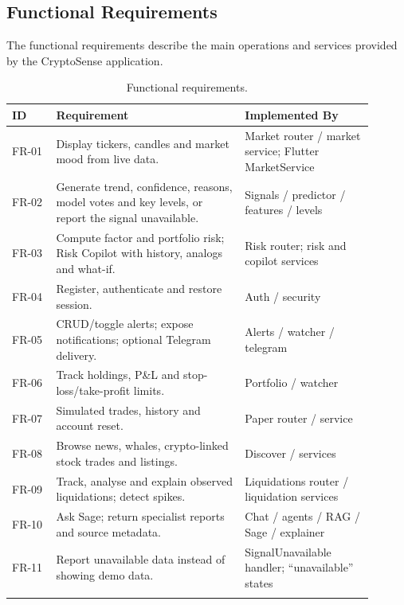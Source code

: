 \subsection{Functional Requirements}
The functional requirements describe the main operations and services provided by the CryptoSense application.
{\renewcommand{\arraystretch}{1.3}
\begin{longtable}{|p{0.11\linewidth}|p{0.47\linewidth}|p{0.32\linewidth}|}
\hline\textbf{ID} & \textbf{Requirement} & \textbf{Implemented By}\\\hline\endhead
FR-01 & Display tickers, candles and market mood from live data. & Market router / market service; Flutter MarketService\\\hline
FR-02 & Generate trend, confidence, reasons, model votes and key levels, or report the signal unavailable. & Signals / predictor / features / levels\\\hline
FR-03 & Compute factor and portfolio risk; Risk Copilot with history, analogs and what-if. & Risk router; risk and copilot services\\\hline
FR-04 & Register, authenticate and restore session. & Auth / security\\\hline
FR-05 & CRUD/toggle alerts; expose notifications; optional Telegram delivery. & Alerts / watcher / telegram\\\hline
FR-06 & Track holdings, P\&L and stop-loss/take-profit limits. & Portfolio / watcher\\\hline
FR-07 & Simulated trades, history and account reset. & Paper router / service\\\hline
FR-08 & Browse news, whales, crypto-linked stock trades and listings. & Discover / services\\\hline
FR-09 & Track, analyse and explain observed liquidations; detect spikes. & Liquidations router / liquidation services\\\hline
FR-10 & Ask Sage; return specialist reports and source metadata. & Chat / agents / RAG / Sage / explainer\\\hline
FR-11 & Report unavailable data instead of showing demo data. & SignalUnavailable handler; ``unavailable'' states\\\hline
\caption{Functional requirements.}\label{tab:fr}
\end{longtable}}

